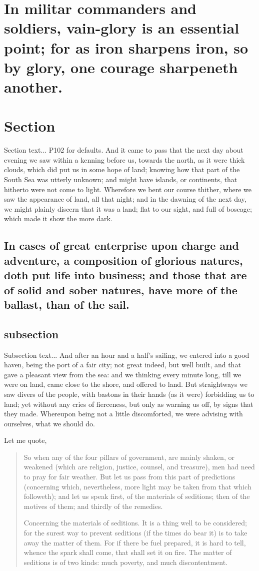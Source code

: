 \documentclass[a4paper, 12pt]{memoir}
\begin{document}
\section*{  In militar commanders and soldiers, vain-glory is an essential point; for as iron sharpens iron, so by glory, one courage sharpeneth another. }
\section*{ Section } 
Section text... P102 for defaults. And it came to pass that the next day about evening we saw within a kenning before us, towards the north, as it were thick clouds, which did put us in some hope of land; knowing how that part of the South Sea was utterly unknown; and might have islands, or continents, that hitherto were not come to light. Wherefore we bent our course thither, where we saw the appearance of land, all that night; and in the dawning of the next day, we might plainly discern that it was a land; flat to our sight, and full of boscage; which made it show the more dark. 

\subsection*{ In cases of great enterprise upon charge and adventure, a composition of glorious natures, doth put life into business; and those that are of solid and sober natures, have more of the ballast, than of the sail. }
\subsection*{subsection }
 Subsection text... And after an hour and a half's sailing, we entered into a good haven, being the port of a fair city; not great indeed, but well built, and that gave a pleasant view from the sea: and we thinking every minute long, till we were on land, came close to the shore, and offered to land. But straightways we saw divers of the people, with bastons in their hands (as it were) forbidding us to land; yet without any cries of fierceness, but only as warning us off, by signs that they made. Whereupon being not a little discomforted, we were advising with ourselves, what we should do.

Let me quote,
\begin{quote} 
So when any of the four pillars of government, are mainly shaken, or weakened (which are religion, justice, counsel, and treasure), men had need to pray for fair weather. But let us pass from this part of predictions (concerning which, nevertheless, more light may be taken from that which followeth); and let us speak first, of the materials of seditions; then of the motives of them; and thirdly of the remedies. 

Concerning the materials of seditions. It is a thing well to be considered; for the surest way to prevent seditions (if the times do bear it) is to take away the matter of them. For if there be fuel prepared, it is hard to tell, whence the spark shall come, that shall set it on fire. The matter of seditions is of two kinds: much poverty, and much discontentment. 
 \end{quote}
\end{document}
